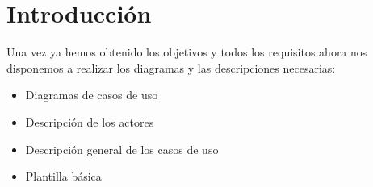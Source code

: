 \chapter{Introducción}
Una vez ya hemos obtenido los objetivos y todos los requisitos ahora nos disponemos a realizar los diagramas y las descripciones necesarias:
\begin{itemize}
\item Diagramas de casos de uso
\item Descripción de los actores
\item Descripción general de los casos de uso
\item Plantilla básica
\end{itemize}